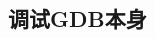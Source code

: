 \documentclass[class=book, crop=false]{standalone}
\begin{document}
\begin{CJK}{UTF8}{gbsn}

\chapter{调试GDB本身}



\cleardoublepage

\end{CJK}
\end{document}
